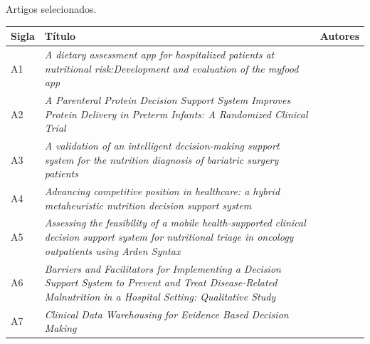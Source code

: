 \begin{quadro}[htb]
\caption{\label{quadro_artigosSelecionados}Artigos selecionados.}
\begin{tabular}{|p{}|p{7cm}|p{5cm}|}
	\hline
	\textbf{Sigla} & \textbf{Título} & \textbf{Autores} \\ \hline
	A1  & \textit{A dietary assessment app for hospitalized patients at nutritional risk:Development and evaluation of the myfood app} & \cite{paulsen2018_1} \\ \hline
	A2  & \textit{A Parenteral Protein Decision Support System Improves Protein Delivery in Preterm Infants: A Randomized Clinical Trial} & \cite{alrifai2017} \\ \hline
	A3  & \textit{A validation of an intelligent decision-making support system for the nutrition diagnosis of bariatric surgery patients} & \cite{cruz2017} \\ \hline
	A4  & \textit{Advancing competitive position in healthcare: a hybrid metaheuristic nutrition decision support system} & \cite{ileri2019} \\ \hline
	A5  & \textit{Assessing the feasibility of a mobile health-supported clinical decision support system for nutritional triage in oncology outpatients using Arden Syntax} & \cite{bruin2018} \\ \hline
	A6  & \textit{Barriers and Facilitators for Implementing a Decision Support System to Prevent and Treat Disease-Related Malnutrition in a Hospital Setting: Qualitative Study} & \cite{paulsen2018_2} \\ \hline
	A7  & \textit{Clinical Data Warehousing for Evidence Based Decision Making} & \cite{narra2015} \\ \hline
\end{tabular}
\end{quadro} 

